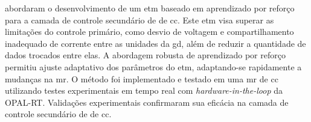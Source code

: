 \cite{Negahdar2024} abordaram o desenvolvimento de um \acrshort{etm} baseado em aprendizado por reforço para a camada de controle secundário de  de \acrshort{cc}. Este \acrshort{etm} visa superar as limitações do controle primário, como desvio de voltagem e compartilhamento inadequado de corrente entre as unidades da \acrshort{gd}, além de reduzir a quantidade de dados trocados entre elas. A abordagem robusta de aprendizado por reforço permitiu ajuste adaptativo dos parâmetros do \acrshort{etm}, adaptando-se rapidamente a mudanças na \acrshort{mr}. O método foi implementado e testado em uma \acrshort{mr} de \acrshort{cc} utilizando testes experimentais em tempo real com \textit{hardware-in-the-loop} da OPAL-RT. Validações experimentais confirmaram sua eficácia na camada de controle secundário de  de \acrshort{cc}.
